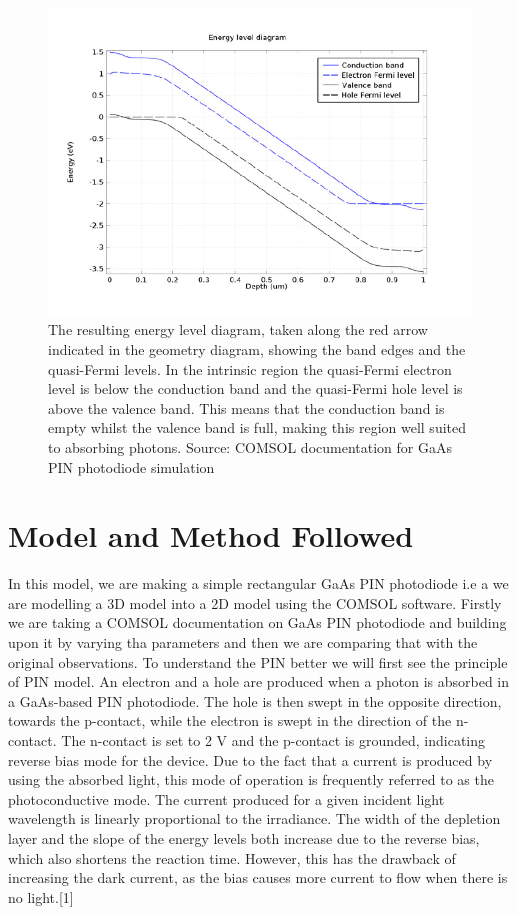 \documentclass[conference]{IEEEtran}
\begin{document}
\begin{figure}
\begin{center}
\includegraphics[scale = 0.4]{Energy.png}
\caption{The resulting energy level diagram, taken along the red arrow indicated in the geometry diagram, showing the band edges and the quasi-Fermi levels. In the intrinsic region the quasi-Fermi electron level is below the conduction band and the quasi-Fermi hole level is above the valence band. This means that the conduction band is empty whilst the valence band is full, making this region well suited to absorbing photons. Source: COMSOL documentation for GaAs PIN photodiode simulation}
\end{center}
\end{figure}



\section{Model and Method Followed}
In this model, we are making a simple rectangular GaAs PIN photodiode i.e a we are modelling a 3D model into a 2D model using the COMSOL software. Firstly we are taking a COMSOL documentation on GaAs PIN photodiode and building upon it by varying tha parameters and then we are comparing that with the original observations. To understand the PIN better we will first see the principle of PIN model. An electron and a hole are produced when a photon is absorbed in a GaAs-based PIN photodiode. The hole is then swept in the opposite direction, towards the p-contact, while the electron is swept in the direction of the n-contact. The n-contact is set to 2 V and the p-contact is grounded, indicating reverse bias mode for the device. Due to the fact that a current is produced by using the absorbed light, this mode of operation is frequently referred to as the photoconductive mode. The current produced for a given incident light wavelength is linearly proportional to the irradiance. The width of the depletion layer and the slope of the energy levels both increase due to the reverse bias, which also shortens the reaction time. However, this has the drawback of increasing the dark current, as the bias causes more current to flow when there is no light.[1]\\
\end{document}
